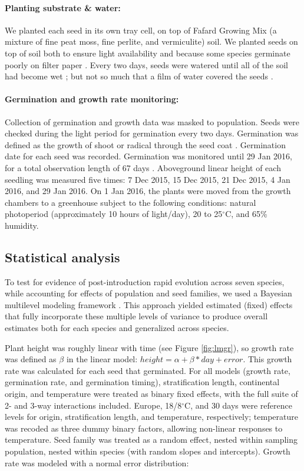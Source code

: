 \documentclass[12pt]{article}\usepackage[]{graphicx}\usepackage[]{color}
\begin{document}
	\paragraph{Planting substrate \& water:} We planted each seed in its own tray cell, on top of Fafard Growing Mix (a mixture of fine peat moss, fine perlite, and vermiculite) soil. We planted seeds on top of soil both to ensure light availability \parencite{Tester1987} and because some species germinate poorly on filter paper \parencite{Andrews1974}. Every two days, seeds were watered until all of the soil had become wet \parencite{Steinbauer1957}; but not so much that a film of water covered the seeds \parencite{AOSA1960}.
	
	\paragraph{Germination and growth rate monitoring:}  Collection of germination and growth data was masked to population. Seeds were checked during the light period for germination every two days. Germination was defined as the growth of shoot or radical through the seed coat \parencite{Baskin1998,Popay1970}. Germination date for each seed was recorded.  Germination was monitored until 29 Jan 2016, for a total observation length of 67 days  \parencite[this is longer than the typical two-week germination trials according to][]{Baskin1998,Wulff1994}. Aboveground linear height of each seedling was measured five times: 7 Dec 2015, 15 Dec 2015, 21 Dec 2015, 4 Jan 2016, and 29 Jan 2016. On 1 Jan 2016, the plants were moved from the growth chambers to a greenhouse subject to the following conditions: natural photoperiod (approximately 10 hours of light/day), 20 to 25$^\circ$C, and 65\% humidity.
	\subsection{Statistical analysis} 
	To test for evidence of post-introduction rapid evolution across seven species, while accounting for effects of population and seed families, we used a Bayesian multilevel modeling framework \parencite{Carpenter2017}. This approach yielded estimated (fixed) effects that fully incorporate these multiple levels of variance to produce overall estimates both for each species and generalized across species.  %

Plant height was roughly linear with time (see Figure \ref{fig:lmgr}), so growth rate was defined as $\beta$ in the linear model: $height = \alpha + \beta*day + error $. This growth rate was calculated for each seed that germinated. For all models (growth rate, germination rate, and germination timing), stratification length, continental origin, and temperature were treated as binary fixed effects, with the full suite of 2- and 3-way interactions included. Europe, 18/8$^\circ$C, and 30 days were reference levels for origin, stratification length, and temperature, respectively; temperature was recoded as three dummy binary factors, allowing non-linear responses to temperature. Seed family was treated as a random effect, nested within sampling population, nested within species (with random slopes and intercepts). Growth rate was modeled with a normal error distribution: 
\end{document}
